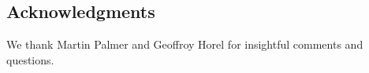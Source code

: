 
\subsection*{Acknowledgments}

We thank Martin Palmer and Geoffroy Horel for insightful comments and questions.